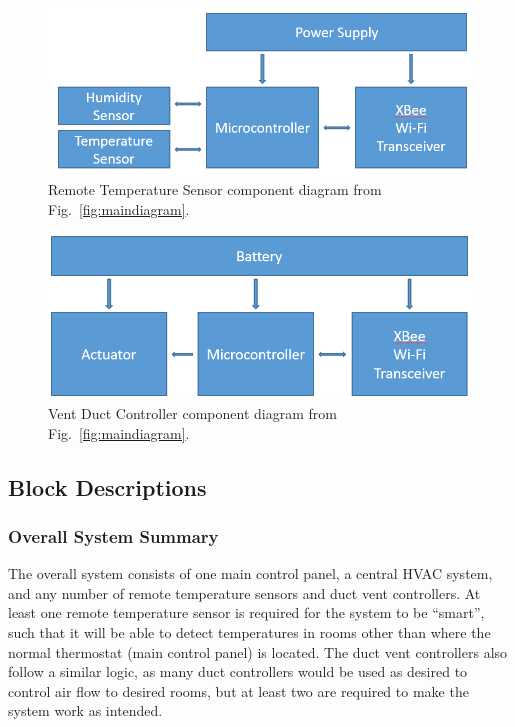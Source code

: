 \begin{figure}[htb]
\centering
\includegraphics[width=.9\textwidth]{RemotePanelDiagram.png}
\caption{Remote Temperature Sensor component diagram from Fig.~\ref{fig:maindiagram}.}
\label{fig:remotediagram}
\end{figure}

\begin{figure}[htb]
\centering
\includegraphics[width=.9\textwidth]{VentCntlDiagram.png}
\caption{Vent Duct Controller component diagram from Fig.~\ref{fig:maindiagram}.}
\label{fig:ventdiagram}
\end{figure}

\subsection{Block Descriptions}
\label{sect:blockdescriptions}
\subsubsection{Overall System Summary}
The overall system  consists of one main control panel, a central HVAC system, and any number of remote temperature sensors and duct vent controllers.  At least one remote temperature sensor is required for the system to be ``smart'', such that it will be able to detect temperatures in rooms other than where the normal thermostat (main control panel) is located.  The duct vent controllers also follow a similar logic, as many duct controllers would be used as desired to control air flow to desired rooms, but at least two are required to make the system work as intended.
